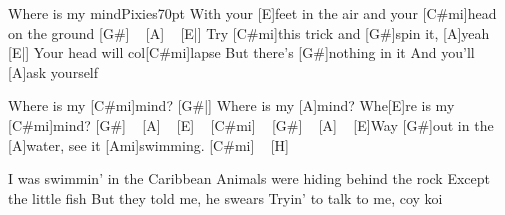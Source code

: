 \begin{song}{Where is my mind}{Pixies}{70pt}
%
With your [E]feet in the air and your [C#mi]head on the ground [G#] ~ [A] ~
[E|]{} Try [C#mi]this trick and [G#]spin it, [A]yeah
[E|]{} Your head will col[C#mi]lapse
But there's [G#]nothing in it
And you'll [A]ask yourself

\chorus%
[E|]{} Where is my [C#mi]mind?
[G#|]{} Where is my [A]mind?
Whe[E]re is my [C#mi]mind? [G#] ~ [A] ~ [E] ~ [C#mi] ~ [G#] ~ [A] ~
[E]Way [G#]out in the [A]water, see it [Ami]swimming. [C#mi] ~ [H] ~

%
I was swimmin' in the Caribbean
Animals were hiding behind the rock
Except the little fish
But they told me, he swears
Tryin' to talk to me, coy koi
\repchor

\repchor

\end{song}
